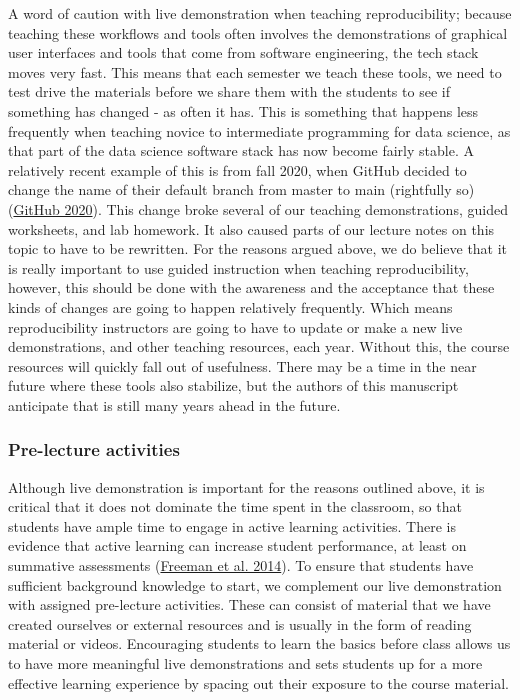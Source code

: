 \documentclass{article}
\begin{document}
A word of caution with live demonstration when teaching reproducibility;
because teaching these workflows and tools often involves the
demonstrations of graphical user interfaces and tools that come from
software engineering, the tech stack moves very fast. This means that
each semester we teach these tools, we need to test drive the materials
before we share them with the students to see if something has changed -
as often it has. This is something that happens less frequently when
teaching novice to intermediate programming for data science, as that
part of the data science software stack has now become fairly stable. A
relatively recent example of this is from fall 2020, when GitHub decided
to change the name of their default branch from master to main
(rightfully so) (\protect\hyperlink{ref-__ak}{GitHub 2020}). This change
broke several of our teaching demonstrations, guided worksheets, and lab
homework. It also caused parts of our lecture notes on this topic to
have to be rewritten. For the reasons argued above, we do believe that
it is really important to use guided instruction when teaching
reproducibility, however, this should be done with the awareness and the
acceptance that these kinds of changes are going to happen relatively
frequently. Which means reproducibility instructors are going to have to
update or make a new live demonstrations, and other teaching resources,
each year. Without this, the course resources will quickly fall out of
usefulness. There may be a time in the near future where these tools
also stabilize, but the authors of this manuscript anticipate that is
still many years ahead in the future.

\hypertarget{pre-lecture-activities}{%
\subsubsection{Pre-lecture activities}\label{pre-lecture-activities}}

Although live demonstration is important for the reasons outlined above,
it is critical that it does not dominate the time spent in the
classroom, so that students have ample time to engage in active learning
activities. There is evidence that active learning can increase student
performance, at least on summative assessments
(\protect\hyperlink{ref-freeman2014active}{Freeman et al. 2014}). To
ensure that students have sufficient background knowledge to start, we
complement our live demonstration with assigned pre-lecture activities.
These can consist of material that we have created ourselves or external
resources and is usually in the form of reading material or videos.
Encouraging students to learn the basics before class allows us to have
more meaningful live demonstrations and sets students up for a more
effective learning experience by spacing out their exposure to the
course material.
\end{document}
